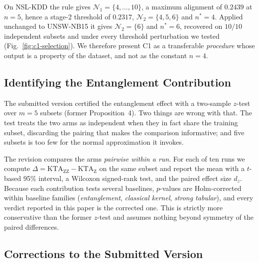 On NSL-KDD the rule gives $\mathcal{N}_1=\{4,\dots,10\}$, a maximum alignment of
$0.2439$ at $n=5$, hence a stage-2 threshold of $0.2317$, $\mathcal{N}_2=\{4,5,6\}$
and $n^{\ast}=4$. Applied unchanged to UNSW-NB15 it gives $\mathcal{N}_2=\{6\}$
and $n^{\ast}=6$, recovered on $10/10$ independent subsets and under every
threshold perturbation we tested (Fig.~\ref{fig:c1-selection}). We therefore
present C1 as a transferable \emph{procedure} whose output is a property of the
dataset, and not as the constant $n=4$.

\subsection{Identifying the Entanglement Contribution}

The submitted version certified the entanglement effect with a two-sample
$z$-test over $m=5$ subsets (former Proposition~4). Two things are wrong with
that. The test treats the two arms as independent when they in fact share the
training subset, discarding the pairing that makes the comparison informative;
and five subsets is too few for the normal approximation it invokes.

The revision compares the arms \emph{pairwise within a run}. For each of ten runs
we compute
$\Delta = \mathrm{KTA}_{\mathrm{ZZ}} - \mathrm{KTA}_{\mathrm{Z}}$ on the same
subset and report the mean with a $t$-based 95\% interval, a Wilcoxon
signed-rank test, and the paired effect size $d_z$. Because each contribution
tests several baselines, $p$-values are Holm-corrected within baseline families
(\emph{entanglement}, \emph{classical kernel}, \emph{strong tabular}), and every
verdict reported in this paper is the corrected one. This is strictly more
conservative than the former $z$-test and assumes nothing beyond symmetry of the
paired differences.

\subsection{Corrections to the Submitted Version}
\label{sec:erratum}

